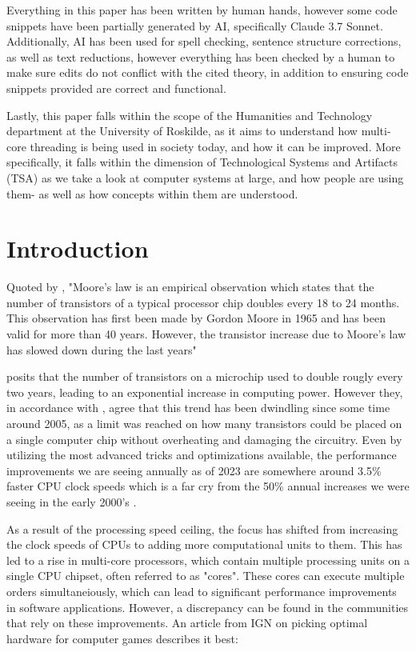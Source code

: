 \documentclass[12pt,a4paper]{article}
\begin{document}
Everything in this paper has been written by human hands, however some code snippets have been partially generated by AI, specifically Claude 3.7 Sonnet. Additionally, AI has been used for spell checking, sentence structure corrections, as well as text reductions, however everything has been checked by a human to make sure edits do not conflict with the cited theory, in addition to ensuring code snippets provided are correct and functional.

Lastly, this paper falls within the scope of the Humanities and Technology department at the University of Roskilde, as it aims to understand how multi-core threading is being used in society today, and how it can be improved. More specifically, it falls within the dimension of Technological Systems and Artifacts (TSA) as we take a look at computer systems at large, and how people are using them- as well as how concepts within them are understood.

\section{Introduction}

Quoted by \cite{Rauber2023}, "Moore’s law is an empirical
observation which states that the number of transistors of a typical processor chip
doubles every 18 to 24 months. This observation has first been made by Gordon
Moore in 1965 and has been valid for more than 40 years. However, the transistor
increase due to Moore’s law has slowed down during the last years" 

\citeauthor{Rauber2023} posits that the number of transistors on a microchip used to double rougly every two years, leading to an exponential increase in computing power. However they, in accordance with \cite{Mattson2014}, agree that this trend has been dwindling since some time around 2005, as a limit was reached on how many transistors could be placed on a single computer chip without overheating and damaging the circuitry. Even by utilizing the most advanced tricks and optimizations available, the performance improvements we are seeing annually as of 2023 are somewhere around 3.5\% faster CPU clock speeds \parencite[p. 11]{Rauber2023} which is a far cry from the 50\% annual increases we were seeing in the early 2000's \parencite[p. 11]{Rauber2023}. 

As a result of the processing speed ceiling, the focus has shifted from increasing the clock speeds of CPUs to adding more computational units to them. This has led to a rise in multi-core processors, which contain multiple processing units on a single CPU chipset, often referred to as "cores". These cores can execute multiple orders simultaneiously, which can lead to significant performance improvements in software applications. However, a discrepancy can be found in the communities that rely on these improvements. An article from IGN \parencite{Thomas2025} on picking optimal hardware for computer games describes it best:
\end{document}
